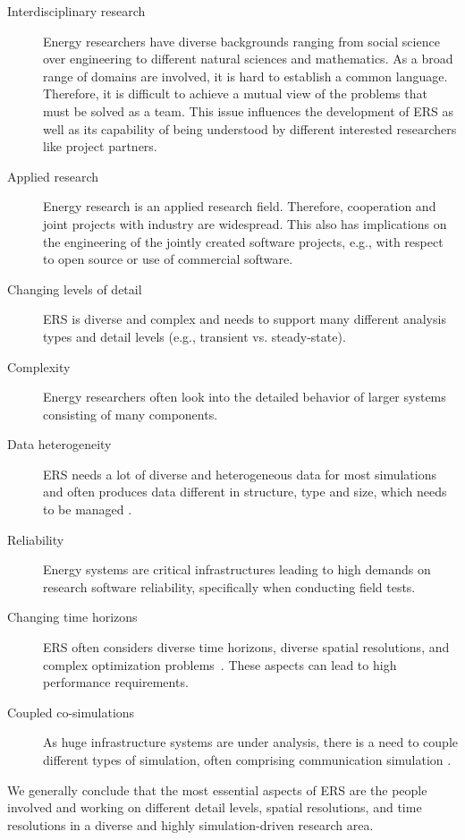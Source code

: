 \begin{description}
    \item [Interdisciplinary research] Energy researchers have diverse backgrounds ranging from social science over engineering to different natural sciences and mathematics. As a broad range of domains are involved, it is hard to establish a common language. Therefore, it is difficult to achieve a mutual view of the problems that must be solved as a team. This issue influences the development of \ac{ERS} as well as its capability of being understood by different interested researchers like project partners.
    \item [Applied research] Energy research is an applied research field. Therefore, cooperation and joint projects with industry are widespread. This also has implications on the engineering of the jointly created software projects, e.g., with respect to open source or use of commercial software.
    \item [Changing levels of detail] \ac{ERS} is diverse and complex and needs to support many different analysis types and detail levels (e.g., transient vs. steady-state).
    \item [Complexity] Energy researchers often look into the detailed behavior of larger systems consisting of many components. 
    \item [Data heterogeneity] \ac{ERS} needs a lot of diverse and heterogeneous data for most simulations and often produces data different in structure, type and size, which needs to be managed \cite{zhang2018big}.
    \item [Reliability] Energy systems are critical infrastructures leading to high demands on research software reliability, specifically when conducting field tests. 
    \item [Changing time horizons] \ac{ERS} often considers diverse time horizons, diverse spatial resolutions, and complex optimization problems~\cite{ENGELAND2017600,DECAROLIS2017184}. These aspects can lead to high performance requirements.
    \item [Coupled co-simulations] As huge infrastructure systems are under analysis, there is a need to couple different types of simulation, often comprising communication simulation  \cite{vogt_survey_2018,steinbrink_cpes_2019}.
\end{description}%

We generally conclude that the most essential aspects of \ac{ERS} are the people involved and working on different detail levels, spatial resolutions, and time resolutions in a diverse and highly simulation-driven research area.